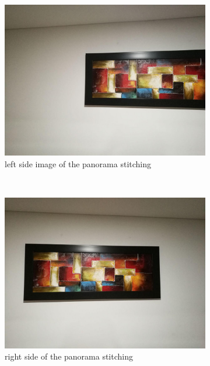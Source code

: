 \documentclass[journal]{IEEEtran}
\begin{document}
\begin{figure}
\centering
\begin{subfigure}[b]{0.2\textwidth}
\includegraphics[scale=0.11]{../img/t1}
\caption{left side image of the panorama stitching}
\end{subfigure}
~ %
\begin{subfigure}[b]{0.2\textwidth}
\includegraphics[scale=0.11]{../img/t2}
\caption{right side of the panorama stitching}
\end{subfigure}
\caption{}
\label{panorama-stitching}
\end{figure}
\end{document}
